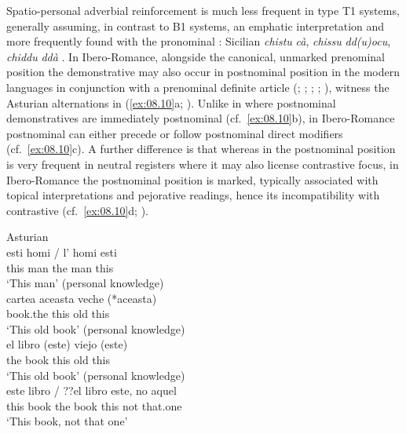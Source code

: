 \documentclass[output=paper]{langsci/langscibook}
\begin{document}
Spatio-personal adverbial reinforcement is much less frequent in type T1
systems, generally assuming, in contrast to B1 systems, an emphatic
interpretation and more frequently found with the pronominal :
Sicilian \emph{chistu} \emph{cà}, \emph{chissu} \emph{dd(u)ocu}, \emph{chiddu}
\emph{ddà} \citep[72]{Pitre:1995a}. In Ibero-Romance, alongside the canonical,
unmarked prenominal position the demonstrative may also occur in postnominal
position in the modern languages in conjunction with a prenominal definite
article (\citealt[84]{Butt:1994a}; \citealt{Bruge:1996a};
\citealt{Bruge:2002a}; \citealt[559--561]{Eguren:2012a};
\citealt[113f]{ledgeway2012latin}), witness the Asturian alternations in
(\ref{ex:08.10}a; \citealt[104f]{ALIA:2001a}). Unlike in  where postnominal
demonstratives are immediately postnominal (cf.\ \ref{ex:08.10}b), in Ibero-Ro\-mance
postnominal  can either precede or follow postnominal direct
modifiers (cf.\ \ref{ex:08.10}c). A further difference is that whereas in  the
postnominal position is very frequent in neutral registers where it may also
license contrastive focus, in Ibero-Romance the postnominal position is marked,
typically associated with topical interpretations and pejorative readings,
hence its incompatibility with contrastive  (cf.\ \ref{ex:08.10}d;
\citealt{Roca:2009a}).

\ea\label{bkm:Ref370498803}\label{ex:08.10}
    \ea Asturian \citep{ALIA:2001a}\\
    \gll esti  homi /  l’  homi  esti\\
            this  man  {} the  man  this\\
    \glt    \enquote*{This man}
    \ex     {} (personal knowledge)\\
    \gll cartea  aceasta  veche (*aceasta)\\
            book.the  this  old   \hphantom{(*}this\\
    \glt    \enquote*{This old book}
    \ex     {} (personal knowledge)\\
    \gll el  libro  (este)  viejo  (este)\\
    the  book  \hphantom{(}this  old  \hphantom{(}this\\
    \glt    \enquote*{This old book}
    \ex     {} (personal knowledge)\\
    \gll este  libro /  ??el  libro  este,  no  aquel\\
            this  book {} \hphantom{??}the  book  this  not  that.one\\
    \glt    \enquote*{This book, not that one}
    \z
\z
\end{document}
